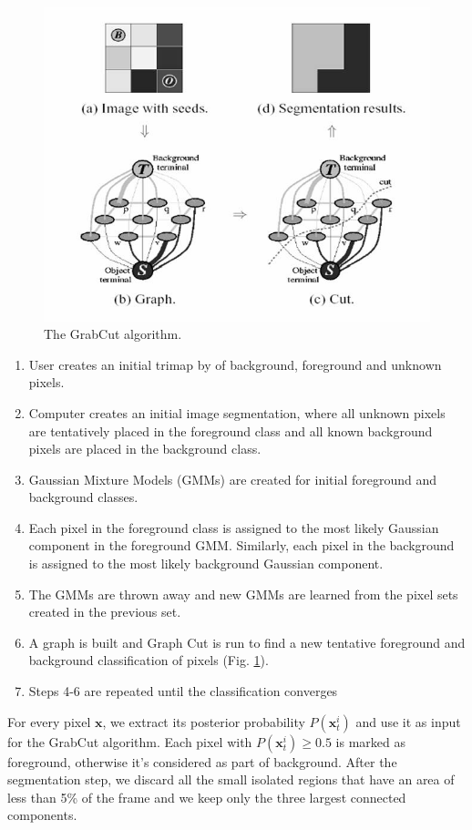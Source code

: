\begin{figure}[htbp]
	\centering
		\includegraphics[width=.75\linewidth]{Figures/grabcut.jpg}
	\caption{The GrabCut algorithm.}
	\label{fig:GrabCut}
\end{figure}
 
\begin{enumerate}
\item User creates an initial trimap by of background, foreground and unknown pixels.
\item Computer creates an initial image segmentation, where all unknown
pixels are tentatively placed in the foreground class
and all known background pixels are placed in the background
class.
\item Gaussian Mixture Models (GMMs) are created for initial foreground
and background classes.
\item Each pixel in the foreground class is assigned to the most
likely Gaussian component in the foreground GMM. Similarly,
each pixel in the background is assigned to the most
likely background Gaussian component.
\item The GMMs are thrown away and new GMMs are learned from
the pixel sets created in the previous set.
\item A graph is built and Graph Cut is run to find a new tentative
foreground and background classification of pixels (Fig. \ref{fig:GrabCut}).
\item Steps 4-6 are repeated until the classification converges

\end{enumerate}

For every pixel $\mathbf{x}$, we extract its posterior probability $P(\mathbf{x}_{t}^{i})$ and use it as input for the GrabCut algorithm. Each pixel with $P(\mathbf{x}_{t}^{i}) \geq 0.5$ is marked as foreground, otherwise it's considered as part of background. After the segmentation step, we discard all the small isolated regions that have an area of less than 5\% of the frame and we keep only the three largest connected components.

